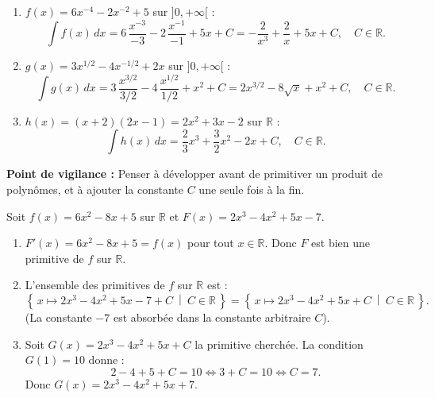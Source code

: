 \documentclass[11pt]{article}
\begin{document}
\begin{corrige}
\begin{enumerate}
    \item $f(x)=6x^{-4}-2x^{-2}+5$ sur $]0,+\infty[$ :
    \[ \int f(x)\,dx=6\,\frac{x^{-3}}{-3}-2\,\frac{x^{-1}}{-1}+5x+C = -\frac{2}{x^3}+\frac{2}{x}+5x+C,\quad C\in\mathbb{R}. \]
    \item $g(x)=3x^{1/2}-4x^{-1/2}+2x$ sur $]0,+\infty[$ :
    \[ \int g(x)\,dx=3\,\frac{x^{3/2}}{3/2}-4\,\frac{x^{1/2}}{1/2}+x^2+C = 2x^{3/2}-8\sqrt{x}+x^2+C,\quad C\in\mathbb{R}. \]
    \item $h(x)=(x+2)(2x-1)=2x^2+3x-2$ sur $\mathbb{R}$ :
    \[ \int h(x)\,dx=\frac{2}{3}x^3+\frac{3}{2}x^2-2x+C,\quad C\in\mathbb{R}. \]
\end{enumerate}
\textbf{Point de vigilance :} Penser à développer avant de primitiver un produit de polynômes, et à ajouter la constante $C$ une seule fois à la fin.
\end{corrige}

\begin{corrige}
Soit $f(x)=6x^2-8x+5$ sur $\mathbb{R}$ et $F(x)=2x^3-4x^2+5x-7$.
\begin{enumerate}
    \item $F'(x)=6x^2-8x+5=f(x)$ pour tout $x\in\mathbb{R}$. Donc $F$ est bien une primitive de $f$ sur $\mathbb{R}$.
    \item L'ensemble des primitives de $f$ sur $\mathbb{R}$ est :
    \[ \left\{\,x\mapsto 2x^3-4x^2+5x-7+C\ \middle|\ C\in\mathbb{R}\,\right\}=\left\{\,x\mapsto 2x^3-4x^2+5x+C\ \middle|\ C\in\mathbb{R}\,\right\}. \]
    (La constante $-7$ est absorbée dans la constante arbitraire $C$).
    \item Soit $G(x)=2x^3-4x^2+5x+C$ la primitive cherchée. La condition $G(1)=10$ donne :
    \[ 2-4+5+C=10 \iff 3+C=10 \iff C=7. \]
    Donc $G(x)=2x^3-4x^2+5x+7$.
\end{enumerate}
\end{corrige}
\end{document}
